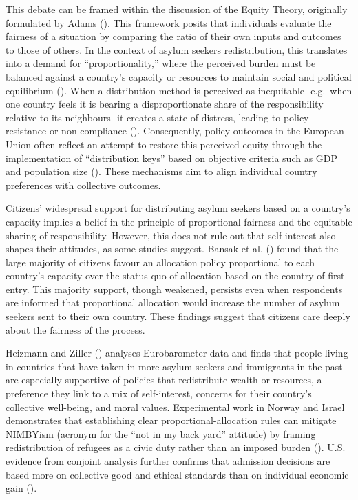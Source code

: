 \documentclass[
  12pt,
  a4paper,
]{article}
\begin{document}
This debate can be framed within the discussion of the Equity Theory, originally formulated by Adams (). This framework posits that individuals evaluate the fairness of a situation by comparing the ratio of their own inputs and outcomes to those of others. In the context of asylum seekers redistribution, this translates into a demand for ``proportionality,'' where the perceived burden must be balanced against a country's capacity or resources to maintain social and political equilibrium (). When a distribution method is perceived as inequitable -e.g.~when one country feels it is bearing a disproportionate share of the responsibility relative to its neighbours- it creates a state of distress, leading to policy resistance or non-compliance (). Consequently, policy outcomes in the European Union often reflect an attempt to restore this perceived equity through the implementation of ``distribution keys'' based on objective criteria such as GDP and population size (). These mechanisms aim to align individual country preferences with collective outcomes.

Citizens' widespread support for distributing asylum seekers based on a country's capacity implies a belief in the principle of proportional fairness and the equitable sharing of responsibility. However, this does not rule out that self-interest also shapes their attitudes, as some studies suggest. Bansak et al. () found that the large majority of citizens favour an allocation policy proportional to each country's capacity over the status quo of allocation based on the country of first entry. This majority support, though weakened, persists even when respondents are informed that proportional allocation would increase the number of asylum seekers sent to their own country. These findings suggest that citizens care deeply about the fairness of the process.

Heizmann and Ziller () analyses Eurobarometer data and finds that people living in countries that have taken in more asylum seekers and immigrants in the past are especially supportive of policies that redistribute wealth or resources, a preference they link to a mix of self-interest, concerns for their country's collective well-being, and moral values. Experimental work in Norway and Israel demonstrates that establishing clear proportional-allocation rules can mitigate NIMBYism (acronym for the ``not in my back yard'' attitude) by framing redistribution of refugees as a civic duty rather than an imposed burden (). U.S. evidence from conjoint analysis further confirms that admission decisions are based more on collective good and ethical standards than on individual economic gain ().
\end{document}
